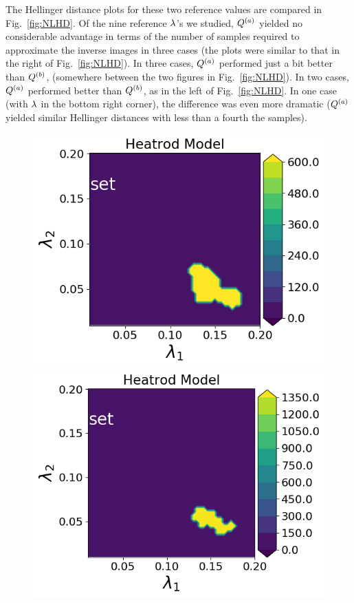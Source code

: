 The Hellinger distance plots for these two reference values are compared in Fig.~\ref{fig:NLHD}.
Of the nine reference $\lambda$'s we studied, $Q^{(a)}$ yielded no considerable advantage in terms of the number of samples required to approximate the inverse images in three cases (the plots were similar to that in the right of Fig.~\ref{fig:NLHD}).
In three cases, $Q^{(a)}$ performed just a bit better than $Q^{(b)}$, (somewhere between the two figures in Fig.~\ref{fig:NLHD}).
In two cases, $Q^{(a)}$ performed better than  $Q^{(b)}$, as in the left of Fig.~\ref{fig:NLHD}.
In one case (with $\lambda$ in the bottom right corner), the difference was even more dramatic ($Q^{(a)}$ yielded similar Hellinger distances with less than a fourth the samples).

\begin{figure}
\begin{minipage}{.4\textwidth}
\includegraphics[width=\linewidth]{examples/fig_heatrod_q1/HeatrodModel--set_N50_em.png}
\includegraphics[width=\linewidth]{examples/fig_heatrod_q1/HeatrodModel--set_N500_em.png}


\end{minipage}
\end{figure}
